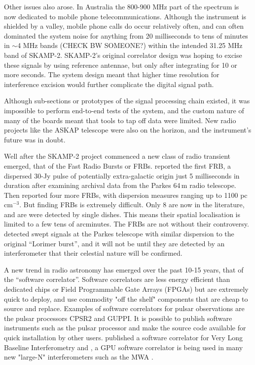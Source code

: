 Other issues also arose. In Australia the 800-900 MHz part of the spectrum is now dedicated to mobile phone telecommunications. Although the instrument is shielded by a valley, mobile phone calls do occur relatively often, and can often dominated the system noise for anything from 20 milliseconds to tens of minutes in $\sim$4 MHz bands (CHECK BW SOMEONE?) within the intended 31.25 MHz band of SKAMP-2. SKAMP-2's original correlator design was hoping to excise these signals by using reference antennae, but only after integrating for 10 or more seconds. The system design meant that higher time resolution for interference excision would further complicate the digital signal path. 

Although sub-sections or prototypes of the signal processing chain existed, it was impossible to perform end-to-end tests of the system, and the custom nature of many of the boards meant that tools to tap off data were limited.  New radio projects like the ASKAP telescope were also on the horizon, and the instrument's future was in doubt.

Well after the SKAMP-2 project commenced a new class of radio transient emerged, that of the Fast Radio Bursts or FRBs. \cite{Lorimer_2007} reported the first FRB, a dispersed 30-Jy pulse of potentially extra-galactic origin just 5 milliseconds in duration after examining archival data from the Parkes 64\,m radio telescope. Then \cite{Thornton_2013} reported four more FRBs, with dispersion measures ranging up to 1100 pc cm$^{-3}$. But finding FRBs is extremely difficult. Only 8 are now in the literature, and are were detected by single dishes. This means their spatial localisation is limited to a few tens of arcminutes. 
The FRBs are not without their controversy. \cite{Burke_Spolaor_2011} detected swept signals at the Parkes telescope with similar dispersion to the original ``Lorimer burst'', and it will not be until they are detected by an interferometer that their celestial nature will be confirmed.

A new trend in radio astronomy has emerged over the past 10-15 years, that of the ``software correlator''. Software correlators are less energy efficient than dedicated chips or Field Programmable Gate Arrays (FPGAs) but are extremely quick to deploy, and use commodity "off the shelf" components that are cheap to source and replace. Examples of software correlators for pulsar observations are the pulsar processors CPSR2 \cite{Bailes_2009} and GUPPI\cite{DuPlain_2008}. It is possible to publish software instruments such as the pulsar processor  \cite{van_Straten_2011} and make the source code available for quick installation by other users. \cite{Deller_2007} published  a software correlator for Very Long Baseline Interferometry and  \cite{Clark_2012}, a GPU software correlator is being used in many new "large-N" interferometers such as the MWA \cite{Tingay_2013}. 



